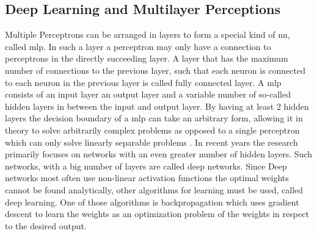 \subsection{Deep Learning and Multilayer Perceptions}
Multiple Perceptrons can be arranged in layers to form a special kind of \ac{nn}, called \ac{mlp}. In such a layer a perceptron may only have a connection to perceptrons in the directly succeeding layer. A layer that has the maximum number of connections to the previous layer, such that each neuron is connected to each neuron in the previous layer is called fully connected layer. A \ac{mlp} consists of an input layer an output layer and a variable number of so-called hidden layers in between the input and output layer. By having at least 2 hidden layers the decision boundary of a \ac{mlp} can take an arbitrary form, allowing it in theory to solve arbitrarily complex problems as opposed to a single perceptron which can only solve linearly separable problems \cite{Lapedes1988}. In recent years the research primarily focuses on networks with an even greater number of hidden layers. Such networks, with a big number of layers are called deep networks. Since Deep networks most often use non-linear activation functions the optimal weights cannot be found analytically, other algorithms for learning must be used, called deep learning. One of those algorithms is backpropagation which uses gradient descent to learn the weights as an optimization problem of the weights in respect to the desired output.

